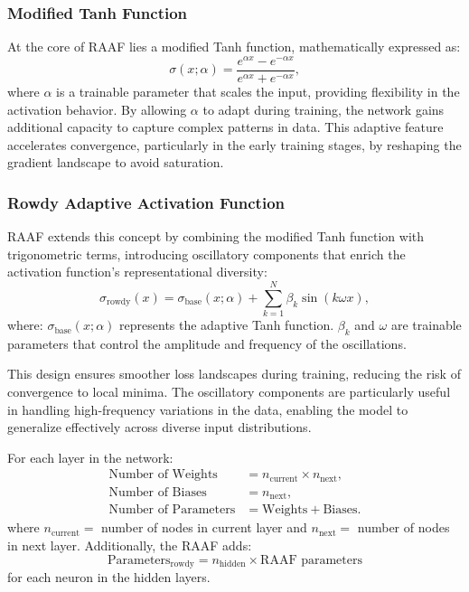 \subsubsection{Modified Tanh Function}
At the core of RAAF lies a modified Tanh function, mathematically expressed as:
\[
\sigma(x; \alpha) = \frac{e^{\alpha x} - e^{-\alpha x}}{e^{\alpha x} + e^{-\alpha x}},
\]
where \( \alpha \) is a trainable parameter that scales the input, providing flexibility in the activation behavior. By allowing \( \alpha \) to adapt during training, the network gains additional capacity to capture complex patterns in data. This adaptive feature accelerates convergence, particularly in the early training stages, by reshaping the gradient landscape to avoid saturation.

\subsubsection{Rowdy Adaptive Activation Function}
RAAF \cite{jagtap2022deep} extends this concept by combining the modified Tanh function with trigonometric terms, introducing oscillatory components that enrich the activation function's representational diversity:
\[
\sigma_{\text{rowdy}}(x) = \sigma_{\text{base}}(x; \alpha) + \sum_{k=1}^N \beta_k \sin(k \omega x),
\]
where:
\( \sigma_{\text{base}}(x; \alpha) \) represents the adaptive Tanh function. 
\( \beta_k \) and \( \omega \) are trainable parameters that control the amplitude and frequency of the oscillations.

This design ensures smoother loss landscapes during training, reducing the risk of convergence to local minima. The oscillatory components are particularly useful in handling high-frequency variations in the data, enabling the model to generalize effectively across diverse input distributions.

For each layer in the network:
\begin{align*}
\text{Number of  Weights} &=  n_\text{current} \times n_\text{next}, \\
\text{Number of Biases} &= n_\text{next}, \\
\text{Number of Parameters} &= \text{Weights} + \text{Biases}.
\end{align*}
where $ n_\text{current} = $ number of nodes in current layer and $ n_\text{next} = $ number of nodes in next layer. 
Additionally, the RAAF adds:
\[
\text{Parameters}_\text{rowdy} = n_\text{hidden} \times \text{RAAF parameters}
\]
for each neuron in the hidden layers.

